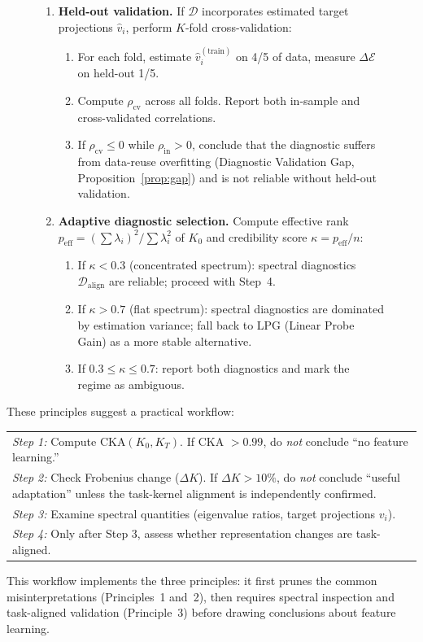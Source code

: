 \documentclass[twoside,11pt]{article}
\begin{document}
\begin{figure}[t]
\begin{enumerate}
    \item \textbf{Held-out validation.}
    If $\mathcal{D}$ incorporates estimated target projections $\hat{v}_i$, perform $K$-fold cross-validation:
    \begin{enumerate}
        \item For each fold, estimate $\hat{v}_i^{(\text{train})}$ on 4/5 of data, measure $\Delta\mathcal{E}$ on held-out 1/5.
        \item Compute $\rho_{\text{cv}}$ across all folds.  Report both in-sample and cross-validated correlations.
        \item If $\rho_{\text{cv}} \leq 0$ while $\rho_{\text{in}} > 0$, conclude that the diagnostic suffers from data-reuse overfitting (Diagnostic Validation Gap, Proposition~\ref{prop:gap}) and is not reliable without held-out validation.
    \end{enumerate}
    \item \textbf{Adaptive diagnostic selection.}
    Compute effective rank $p_{\text{eff}} = (\sum \lambda_i)^2 / \sum \lambda_i^2$ of $K_0$ and credibility score $\kappa = p_{\text{eff}} / n$:
    \begin{enumerate}
        \item If $\kappa < 0.3$ (concentrated spectrum): spectral diagnostics $\mathcal{D}_{\text{align}}$ are reliable; proceed with Step~4.
        \item If $\kappa > 0.7$ (flat spectrum): spectral diagnostics are dominated by estimation variance; fall back to LPG (Linear Probe Gain) as a more stable alternative.
        \item If $0.3 \leq \kappa \leq 0.7$: report both diagnostics and mark the regime as ambiguous.
    \end{enumerate}
\end{enumerate}
\end{figure}

These principles suggest a practical workflow:
\begin{center}
\small
\begin{tabular}{p{}}
\emph{Step 1:} Compute CKA$(K_0, K_T)$. If CKA $> 0.99$, do \emph{not} conclude ``no feature learning.'' \\
\emph{Step 2:} Check Frobenius change ($\Delta K$). If $\Delta K > 10\%$, do \emph{not} conclude ``useful adaptation'' unless the task-kernel alignment is independently confirmed. \\
\emph{Step 3:} Examine spectral quantities (eigenvalue ratios, target projections $v_i$). \\
\emph{Step 4:} Only after Step 3, assess whether representation changes are task-aligned.
\end{tabular}
\end{center}
This workflow implements the three principles: it first prunes the common misinterpretations (Principles~1 and~2), then requires spectral inspection and task-aligned validation (Principle~3) before drawing conclusions about feature learning.
\end{document}

